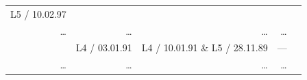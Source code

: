 \documentclass[a4paper, notitlepage, 12pt, krantz2]{krantz}
\begin{document}
\begin{longtable}[]{@{}rrrrr@{}}
\begin{minipage}[t]{0.20\columnwidth}
L5 / 10.02.97\strut
\end{minipage} & \begin{minipage}[t]{0.18\columnwidth}\raggedleft
\strut
\end{minipage}\tabularnewline
\begin{minipage}[t]{0.07\columnwidth}\raggedleft
\ldots{}\strut
\end{minipage} & \begin{minipage}[t]{0.20\columnwidth}\raggedleft
\ldots{}\strut
\end{minipage} & \begin{minipage}[t]{0.20\columnwidth}\raggedleft
\ldots{}\strut
\end{minipage} & \begin{minipage}[t]{0.20\columnwidth}\raggedleft
\ldots{}\strut
\end{minipage} & \begin{minipage}[t]{0.18\columnwidth}\raggedleft
\strut
\end{minipage}\tabularnewline
\begin{minipage}[t]{0.07\columnwidth}\raggedleft
1991\strut
\end{minipage} & \begin{minipage}[t]{0.20\columnwidth}\raggedleft
L4 / 03.01.91\strut
\end{minipage} & \begin{minipage}[t]{0.20\columnwidth}\raggedleft
L4 / 10.01.91 \& L5 / 28.11.89\strut
\end{minipage} & \begin{minipage}[t]{0.20\columnwidth}\raggedleft
---\strut
\end{minipage} & \begin{minipage}[t]{0.18\columnwidth}\raggedleft
\strut
\end{minipage}\tabularnewline
\begin{minipage}[t]{0.07\columnwidth}\raggedleft
\ldots{}\strut
\end{minipage} & \begin{minipage}[t]{0.20\columnwidth}\raggedleft
\ldots{}\strut
\end{minipage} & \begin{minipage}[t]{0.20\columnwidth}\raggedleft
\ldots{}\strut
\end{minipage} & \begin{minipage}[t]{0.20\columnwidth}\raggedleft
\ldots{}\strut
\end{minipage} & \begin{minipage}[t]{0.18\columnwidth}\raggedleft

\end{minipage}
\end{longtable}
\end{document}
